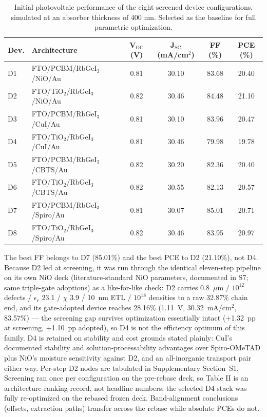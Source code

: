 \documentclass[review]{elsarticle}
\begin{document}
\begin{table}[htbp]
\centering
{\footnotesize\setlength{\tabcolsep}{3pt}
\begin{tabularx}{\textwidth}{XXcccc}
\hline
Dev. & Architecture & V$_{\mathrm{OC}}$ (V) & J$_{\mathrm{SC}}$ (mA/cm$^{2}$) & FF (\%) & PCE (\%)
\\\hline
D1 & FTO/\allowbreak{}PCBM/\allowbreak{}RbGeI$_{3}$/NiO/\allowbreak{}Au & 0.81 & 30.10 & 83.68 & 20.40\\
D2 & FTO/\allowbreak{}TiO$_{2}$/RbGeI$_{3}$/NiO/\allowbreak{}Au & 0.82 & 30.46 & 84.48 & 21.10\\
D3 & FTO/\allowbreak{}PCBM/\allowbreak{}RbGeI$_{3}$/CuI/\allowbreak{}Au & 0.81 & 30.10 & 83.96 & 20.47\\
D4 & FTO/\allowbreak{}TiO$_{2}$/RbGeI$_{3}$/CuI/\allowbreak{}Au & 0.81 & 30.46 & 79.98 & 19.78\\
D5 & FTO/\allowbreak{}PCBM/\allowbreak{}RbGeI$_{3}$/CBTS/\allowbreak{}Au & 0.82 & 30.20 & 82.36 & 20.40\\
D6 & FTO/\allowbreak{}TiO$_{2}$/RbGeI$_{3}$/CBTS/\allowbreak{}Au & 0.82 & 30.55 & 82.13 & 20.57\\
D7 & FTO/\allowbreak{}PCBM/\allowbreak{}RbGeI$_{3}$/Spiro/Au & 0.81 & 30.07 & 85.01 & 20.71\\
D8 & FTO/\allowbreak{}TiO$_{2}$/RbGeI$_{3}$/Spiro/Au & 0.82 & 30.46 & 83.95 & 20.97\\
\hline
\end{tabularx}
}
\caption{Initial photovoltaic performance of the eight screened device configurations, simulated at an absorber thickness of 400 nm.  Selected as the baseline for full parametric optimization.}
\end{table}
The best FF belongs to D7 (85.01\%) and the best PCE to D2 (21.10\%), not D4. Because D2 led at screening, it was run through the identical eleven-step pipeline on its own NiO deck (literature-standard NiO parameters, documented in S7; same triple-gate adoptions) as a like-for-like check: D2 carries 0.8~$\mu$m / $10^{12}$ defects / $\epsilon_{r}$ 23.1 / $\chi$ 3.9 / 10~nm ETL / $10^{18}$ densities to a raw 32.87\% chain end, and its gate-adopted device reaches 28.16\% (1.11~V, 30.32~mA/cm$^{2}$, 83.57\%) --- the screening gap survives optimization essentially intact (+1.32~pp at screening, +1.10~pp adopted), so D4 is not the efficiency optimum of this family. D4 is retained on stability and cost grounds stated plainly: CuI's documented stability and solution-processability advantages over Spiro-OMeTAD \cite{r25,r26} plus NiO's moisture sensitivity against D2, and an all-inorganic transport pair either way. Per-step D2 nodes are tabulated in Supplementary Section~S1. Screening ran once per configuration on the pre-rebase deck, so Table II is an architecture-ranking record, not headline numbers; the selected D4 stack was fully re-optimized on the rebased frozen deck. Band-alignment conclusions (offsets, extraction paths) transfer across the rebase while absolute PCEs do not.
\end{document}
